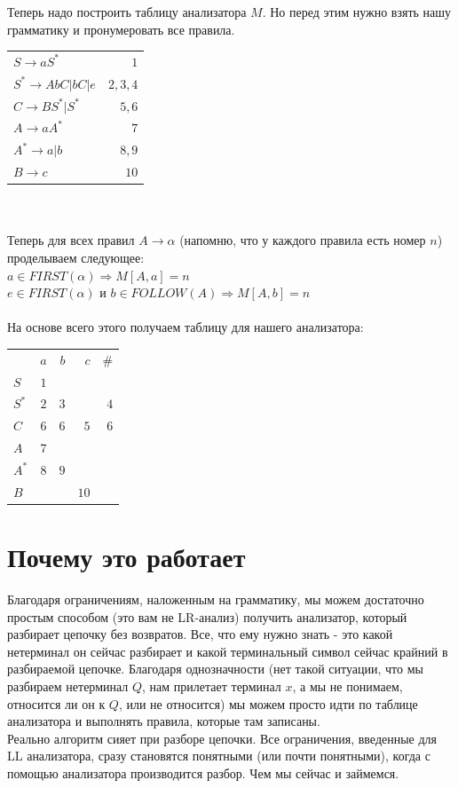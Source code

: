 \documentclass[14pt]{extreport}
\begin{document}
	Теперь надо построить таблицу анализатора $M$. Но перед этим нужно взять нашу грамматику
	и пронумеровать все правила.\\
	\begin{tabular}{lr}
		$S \to aS^*$ & $1$\\
		$S^* \to AbC | bC | e$ & $2,3,4$\\
		$C \to BS^* | S^*$ & $5, 6$\\
		$A \to aA^*$ & $7$\\
		$A^* \to a|b$ & $8,9$\\
		$B \to c$ & $10$\\
	\end{tabular}\\\\
	
	Теперь для всех правил $A \to \alpha$ (напомню, что у каждого правила есть номер $n$)
	проделываем следующее:\\
	\hspace*{30pt}$a \in FIRST(\alpha) \Rightarrow M[A, a] = n$\\
	\hspace*{30pt}$e \in FIRST(\alpha)$ и $b \in FOLLOW(A) \Rightarrow M[A, b] = n$\\\\
	На основе всего этого получаем таблицу для нашего анализатора:\\
	\begin{tabular}{lrrrr}
		& $a$ & $b$ & $c$ & $\#$\\
		$S$ & $1$\\
		$S^*$ & $2$ & $3$ & & $4$\\
		$C$ & $6$ & $6$ & $5$ & $6$\\
		$A$ & $7$\\
		$A^*$ & $8$ & $9$\\
		$B$ & & & $10$\\
	\end{tabular}
	\section{Почему это работает}
	Благодаря ограничениям, наложенным на грамматику, мы можем достаточно простым способом
	(это вам не LR-анализ) получить анализатор, который разбирает цепочку без возвратов.
	Все, что ему нужно знать - это какой нетерминал он сейчас разбирает и какой терминальный
	символ сейчас крайний в разбираемой цепочке. Благодаря однозначности (нет такой ситуации,
	что мы разбираем нетерминал $Q$, нам прилетает терминал $x$, а мы не понимаем,
	относится ли он к $Q$, или не относится) мы можем просто идти по таблице анализатора и
	выполнять правила, которые там записаны.\\
	Реально алгоритм сияет при разборе цепочки. Все ограничения, введенные для LL анализатора,
	сразу становятся понятными (или почти понятными), когда с помощью анализатора производится
	разбор. Чем мы сейчас и займемся.
\end{document}
